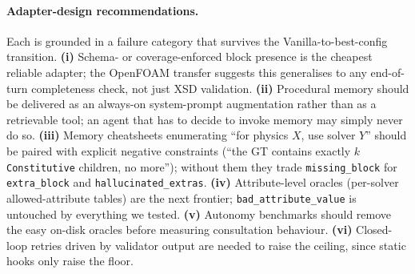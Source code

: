 \documentclass{article}
\begin{document}
\paragraph{Adapter-design recommendations.} Each is grounded in a failure category that survives the Vanilla-to-best-config transition. \textbf{(i)} Schema- or coverage-enforced block presence is the cheapest reliable adapter; the OpenFOAM transfer suggests this generalises to any end-of-turn completeness check, not just XSD validation. \textbf{(ii)} Procedural memory should be delivered as an always-on system-prompt augmentation rather than as a retrievable tool; an agent that has to decide to invoke memory may simply never do so. \textbf{(iii)} Memory cheatsheets enumerating ``for physics $X$, use solver $Y$'' should be paired with explicit negative constraints (``the GT contains exactly $k$ \texttt{Constitutive} children, no more''); without them they trade \texttt{missing\_block} for \texttt{extra\_block} and \texttt{hallucinated\_extras}. \textbf{(iv)} Attribute-level oracles (per-solver allowed-attribute tables) are the next frontier; \texttt{bad\_attribute\_value} is untouched by everything we tested. \textbf{(v)} Autonomy benchmarks should remove the easy on-disk oracles before measuring consultation behaviour. \textbf{(vi)} Closed-loop retries driven by validator output are needed to raise the ceiling, since static hooks only raise the floor.

\end{document}
